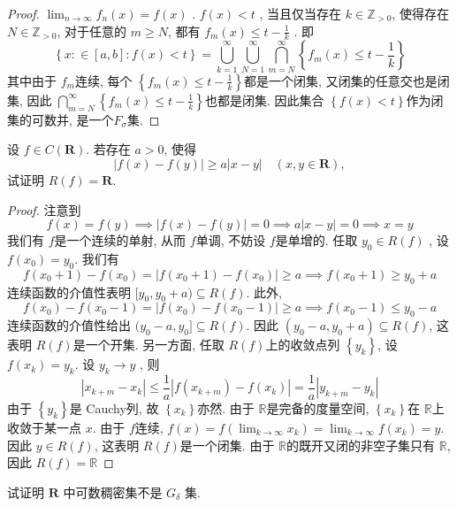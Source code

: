 \documentclass[../main.tex]{subfiles}
\begin{document}
\begin{proof}
    \(  \lim_{n\to \infty}f_{n}\left( x \right)= f\left( x \right)    \) .   \(  f\left( x \right)< t    \) , 当且仅当存在 \(  k \in \mathbb{Z} _{> 0}  \), 使得存在 \(  N\in \mathbb{Z} _{> 0}  \), 对于任意的 \(  m\ge N  \), 都有 \(  f_{m}\left( x \right)\le t-\frac{1 }{k }     \)    . 即  \[
    \left\{ x:\in \left[ a,b \right]:f\left( x \right)< t   \right\}= \bigcup _{k= 1}^{\infty}\bigcup _{N= 1}^{\infty} \bigcap _{m = N}^{\infty}\left\{ f_{m}\left( x \right)\le t-\frac{1 }{k }   \right\}
    \]其中由于 \(  f_{m}  \)连续, 每个 \(  \left\{ f_{m}\left( x \right)\le t-\frac{1 }{k }   \right\}  \)都是一个闭集, 又闭集的任意交也是闭集, 因此 \(  \bigcap _{m= N}^{\infty}\left\{ f_{m}\left( x \right)\le t-\frac{1 }{k }   \right\}  \)也都是闭集. 因此集合 \(  \left\{ f\left( x \right)< t  \right\}  \)作为闭集的可数并, 是一个\(  F_{ \sigma }  \)集.     
\end{proof}
\begin{exercise}{}{}
设 $f \in C(\mathbf{R})$. 若存在 $a>0$, 使得
\[ |f(x)-f(y)| \ge a|x-y| \quad (x,y \in \mathbf{R}), \]
试证明 $R(f)=\mathbf{R}$.
\end{exercise}
\begin{proof}
    注意到 \[
    f\left( x \right)= f\left( y \right)\implies \left| f\left( x \right)-f\left( y \right)   \right|= 0\implies  a\left| x-y \right|= 0\implies  x= y    
    \]我们有 \(  f  \)是一个连续的单射, 从而 \(  f  \)单调, 不妨设 \(  f  \)是单增的.   任取 \(  y_0 \in R\left( f \right)   \)  , 设 \(  f\left( x_0 \right)= y_0   \). 我们有 \[
  f\left( x_0+ 1 \right)-f\left( x_0 \right)=     \left| f\left( x_0+ 1 \right)-f\left( x_0 \right)   \right| \ge a\implies f\left( x_0+ 1 \right)\ge y_0+ a 
    \] 连续函数的介值性表明 \(  [y_0, y_0+ a) \subseteq R\left( f \right)   \). 此外,  \[
    f\left( x_0 \right)-f\left( x_0-1 \right)= \left| f\left( x_0 \right)-f\left( x_0-1 \right)   \right|\ge a   \implies f\left( x_0-1 \right)\le y_0-a 
    \] 连续函数的介值性给出 \(  (y_0-a,y_0]\subseteq R\left( f \right)   \). 因此 \(  \left( y_0-a, y_0+ a \right)\subseteq R\left( f \right)    \), 这表明 \(  R\left( f \right)   \)是一个开集.  另一方面, 任取 \(  R\left( f \right)   \)上的收敛点列 \(  \left\{ y_{k} \right\}  \), 设 \(  f\left( x_{k} \right)= y_{k}   \). 设 \(  y_{k}\to y  \) , 则 \[
    \left| x_{k+ m}-x_{k} \right|\le \frac{1 }{a }\left| f\left( x_{k+ m} \right)-f\left( x_{k} \right)   \right|= \frac{1 }{a }\left| y_{k+ m}-y_{k} \right|     
    \]       由于 \(  \left\{ y_{k} \right\}  \)是 Cauchy列, 故 \(  \left\{ x_{k} \right\}  \)亦然. 由于 \(  \mathbb{R}   \)是完备的度量空间,  \(  \left\{ x_{k} \right\}  \)在 \(  \mathbb{R}   \)上收敛于某一点 \(  x  \). 由于 \(  f  \)连续,  \(  f\left( x \right)= f\left( \lim_{k\to \infty}x_{k} \right)= \lim_{k\to \infty}f\left( x_{k} \right)= y     \). 因此 \(  y \in R\left( f \right)   \), 这表明 \(  R\left( f \right)   \)是一个闭集.  由于 \(  \mathbb{R}   \)的既开又闭的非空子集只有 \(  \mathbb{R}   \), 因此 \(  R\left( f \right)= \mathbb{R}    \)       
\end{proof}
\begin{exercise}{}{}
试证明 $\mathbf{R}$ 中可数稠密集不是 $G_\delta$ 集.
\end{exercise}
\end{document}

